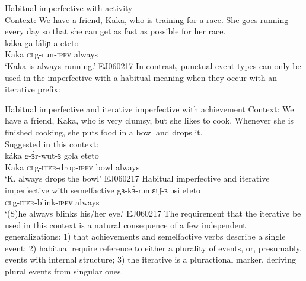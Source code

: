 \ex Habitual imperfective with activity\\
	Context: We have a friend, Kaka, who is training for a race. She goes running every day so that she can get as fast as possible for her race.\\
		\gll káka ga-láliɲ-a eteto\\
			Kaka \textsc{cl}g-run-\textsc{ipfv} always\\
		\glt `Kaka is always running.'  \hfill EJ060217
\z
In contrast, punctual event types can only be used in the imperfective with a habitual meaning when they occur with an iterative prefix:

\ea Habitual imperfective and iterative imperfective with achievement	
	Context: We have a friend, Kaka, who is very clumsy, but she likes to cook. Whenever she is finished cooking, she puts food in a bowl and drops it.\\
	\ex Suggested in this context:\\
		\gll káka g-ɜ́r-wut-ɜ gəla eteto\\
			 Kaka \textsc{cl}g-\textsc{iter}-drop-\textsc{ipfv} bowl always\\
		\glt `K. always drops the bowl'  \hfill EJ060217
	\z
\ex  Habitual imperfective and iterative imperfective with semelfactive	
	\ex  \gll gɜ-kɜ́-rəmɛtʃ-ɜ əsi eteto\\
			 \textsc{cl}g-\textsc{iter}-blink-\textsc{ipfv} always\\
		\glt `(S)he always blinks his/her eye.' \hfill EJ060217
	\z
\z
The requirement that the iterative be used in this context is a natural consequence of a few independent generalizations: 1) that achievements and semelfactive verbs describe a single event; 2) habitual require reference to either a plurality of events, or, presumably, events with internal structure; 3) the iterative is a pluractional marker, deriving plural events from singular ones.

%
%

